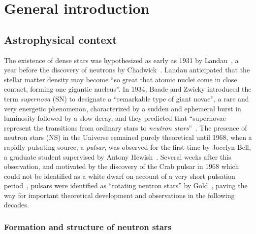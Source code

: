 \chapter*{General introduction}

\section*{Astrophysical context}

The existence of dense stars was hypothesized as early as 1931 
by Landau~\cite{Landau1932}, a year before the discovery of neutrons by
Chadwick~\cite{Chadwick1932}. 
Landau anticipated that the stellar matter density may become ``so great that 
atomic nuclei come in close contact, forming one gigantic 
nucleus''. 
In 1934, Baade and Zwicky introduced the term \textit{supernova} (SN) to 
designate a ``remarkable type of giant novae'', a rare and very energetic 
phenomenon, characterized by a sudden and ephemeral burst in luminosity 
followed by a slow decay, and they predicted that ``supernovae represent the 
transitions from ordinary stars to \textit{neutron stars}''~\cite{Baade1934}.
The presence of neutron stars (NS) in the Universe remained purely theoretical 
until 1968, when a rapidly pulsating source, a \textit{pulsar}, was observed 
for the first time by Jocelyn Bell, a graduate student supervised by Antony 
Hewish~\cite{Hewish1968}. Several weeks after this observation, and motivated 
by the discovery of the Crab pulsar in 1968 which could not be identified as a 
white dwarf on account of a very short pulsation period~\cite{Comella1969}, 
pulsars were identified as ``rotating neutron stars'' by Gold~\cite{Gold1968}, 
paving the way for important theoretical development and observations in the 
following decades.

\subsection*{Formation and structure of neutron stars}


